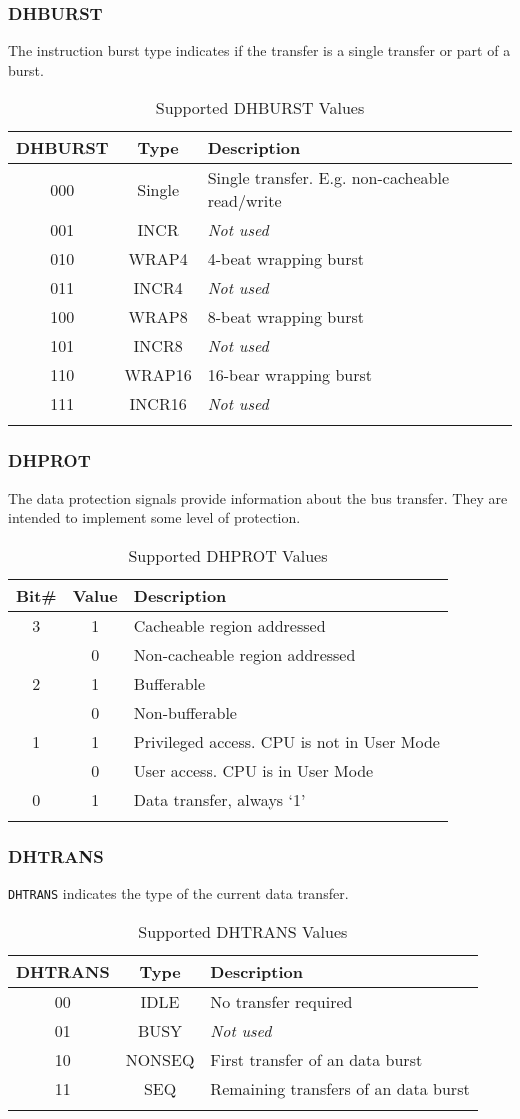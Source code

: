 \subsubsection{DHBURST}\label{dhburst}

The instruction burst type indicates if the transfer is a single
transfer or part of a burst.

\begin{longtable}[]{@{}ccl@{}}
\toprule
DHBURST & Type & Description\tabularnewline
\midrule
\endhead
000 & Single & Single transfer. E.g. non-cacheable
read/write\tabularnewline
001 & INCR & \emph{Not used}\tabularnewline
010 & WRAP4 & 4-beat wrapping burst\tabularnewline
011 & INCR4 & \emph{Not used}\tabularnewline
100 & WRAP8 & 8-beat wrapping burst\tabularnewline
101 & INCR8 & \emph{Not used}\tabularnewline
110 & WRAP16 & 16-bear wrapping burst\tabularnewline
111 & INCR16 & \emph{Not used}\tabularnewline
\bottomrule
\caption{Supported DHBURST Values}
\label{tab:dhburst-values}
\end{longtable}


\subsubsection{DHPROT}\label{dhprot}

The data protection signals provide information about the bus transfer.
They are intended to implement some level of protection.

\begin{longtable}[]{@{}ccl@{}}
\toprule
Bit\# & Value & Description\tabularnewline
\midrule
\endhead
3 & 1 & Cacheable region addressed\tabularnewline
& 0 & Non-cacheable region addressed\tabularnewline
2 & 1 & Bufferable\tabularnewline
& 0 & Non-bufferable\tabularnewline
1 & 1 & Privileged access. CPU is not in User Mode\tabularnewline
& 0 & User access. CPU is in User Mode\tabularnewline
0 & 1 & Data transfer, always `1'\tabularnewline
\bottomrule
\caption{Supported DHPROT Values}
\label{tab:dhprot-values}
\end{longtable}

\subsubsection{DHTRANS}\label{dhtrans}

\texttt{DHTRANS} indicates the type of the current data transfer.

\begin{longtable}[]{@{}ccl@{}}
\toprule
DHTRANS & Type & Description\tabularnewline
\midrule
\endhead
00 & IDLE & No transfer required\tabularnewline
01 & BUSY & \emph{Not used}\tabularnewline
10 & NONSEQ & First transfer of an data burst\tabularnewline
11 & SEQ & Remaining transfers of an data burst\tabularnewline
\bottomrule
\caption{Supported DHTRANS Values}
\label{tab:dhtrans-values}
\end{longtable}

